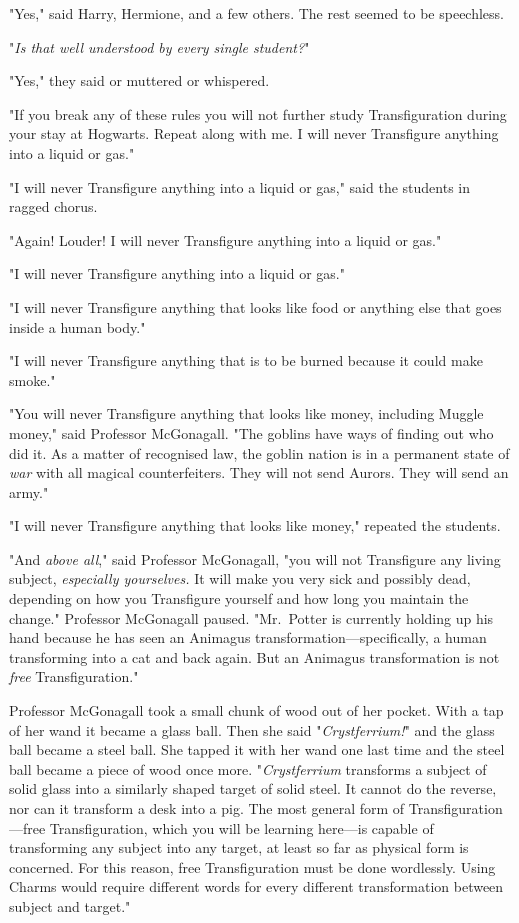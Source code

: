 "Yes," said Harry, Hermione, and a few others. The rest seemed to be speechless.

"\emph{Is that well understood by every single student?}"

"Yes," they said or muttered or whispered.

"If you break any of these rules you will not further study Transfiguration 
during your stay at Hogwarts. Repeat along with me. I will never Transfigure 
anything into a liquid or gas."

"I will never Transfigure anything into a liquid or gas," said the students in 
ragged chorus.

"Again! Louder! I will never Transfigure anything into a liquid or gas."

"I will never Transfigure anything into a liquid or gas."

"I will never Transfigure anything that looks like food or anything else that 
goes inside a human body."

"I will never Transfigure anything that is to be burned because it could make 
smoke."

"You will never Transfigure anything that looks like money, including Muggle 
money," said Professor McGonagall. "The goblins have ways of finding out who 
did it. As a matter of recognised law, the goblin nation is in a permanent 
state of \emph{war} with all magical counterfeiters. They will not send Aurors. 
They will send an army."

"I will never Transfigure anything that looks like money," repeated the 
students.

"And \emph{above all}," said Professor McGonagall, "you will not Transfigure 
any living subject, \emph{especially yourselves.} It will make you very sick 
and possibly dead, depending on how you Transfigure yourself and how long you 
maintain the change." Professor McGonagall paused. "Mr.~Potter is currently 
holding up his hand because he has seen an Animagus 
transformation---specifically, a human transforming into a cat and back again. 
But an Animagus transformation is not \emph{free} Transfiguration."

Professor McGonagall took a small chunk of wood out of her pocket. With a tap 
of her wand it became a glass ball. Then she said "\emph{Crystferrium!}" and 
the glass ball became a steel ball. She tapped it with her wand one last time 
and the steel ball became a piece of wood once more. "\emph{Crystferrium} 
transforms a subject of solid glass into a similarly shaped target of solid 
steel. It cannot do the reverse, nor can it transform a desk into a pig. The 
most general form of Transfiguration---free Transfiguration, which you will be 
learning here---is capable of transforming any subject into any target, at 
least so far as physical form is concerned. For this reason, free 
Transfiguration must be done wordlessly. Using Charms would require different 
words for every different transformation between subject and target."

